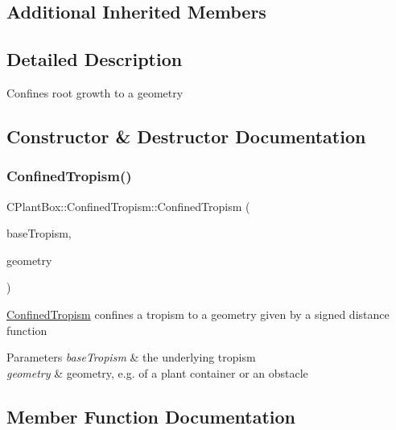 \subsection*{Additional Inherited Members}


\subsection{Detailed Description}
Confines root growth to a geometry 

\subsection{Constructor \& Destructor Documentation}
\mbox{\label{classCPlantBox_1_1ConfinedTropism_a7d90df6c52e1efe154e8e1d9f34a44fb}} 
\subsubsection{\texorpdfstring{Confined\+Tropism()}{ConfinedTropism()}}
{\footnotesize\ttfamily C\+Plant\+Box\+::\+Confined\+Tropism\+::\+Confined\+Tropism (\begin{DoxyParamCaption}\item[{\hyperlink{classCPlantBox_1_1TropismFunction}{Tropism\+Function} $\ast$}]{base\+Tropism,  }\item[{\hyperlink{classCPlantBox_1_1SignedDistanceFunction}{Signed\+Distance\+Function} $\ast$}]{geometry }\end{DoxyParamCaption})\hspace{0.3cm}{\ttfamily [inline]}}

\hyperlink{classCPlantBox_1_1ConfinedTropism}{Confined\+Tropism} confines a tropism to a geometry given by a signed distance function


\begin{DoxyParams}{Parameters}
{\em base\+Tropism} & the underlying tropism \\
\hline
{\em geometry} & geometry, e.\+g. of a plant container or an obstacle \\
\hline
\end{DoxyParams}


\subsection{Member Function Documentation}
\mbox{\label{classCPlantBox_1_1ConfinedTropism_abc56888ea510bc66369c36df3d43ce42}} 
